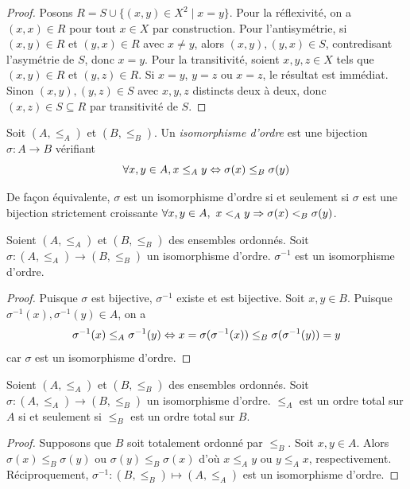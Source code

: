 \begin{proof}
Posons $R = S \cup \{(x,y) \in X^2 \mid x = y\}$. 
Pour la réflexivité, on a $(x,x) \in R$ pour tout $x \in X$ par construction. 
Pour l'antisymétrie, si $(x,y) \in R$ et $(y,x) \in R$ avec $x \neq y$, alors $(x,y), (y,x) \in S$, contredisant l'asymétrie de $S$, donc $x = y$. 
Pour la transitivité, soient $x, y, z \in X$ tels que $(x,y) \in R$ et $(y,z) \in R$. Si $x = y$, $y = z$ ou $x = z$, le résultat est immédiat. Sinon $(x,y), (y,z) \in S$ avec $x, y, z$ distincts deux à deux, donc $(x,z) \in S \subseteq R$ par transitivité de $S$.
\end{proof}
\begin{definition}
    Soit $(A,\le_A)$ et $(B,\le_B)$. Un \emph{isomorphisme d'ordre} est une bijection $\sigma : A\to B$ vérifiant $$\forall x,y\in A, x\le_A y\Leftrightarrow \sigma(x)\le_B \sigma(y)$$ 
\end{definition}
\begin{remarque}
    De façon équivalente, $\sigma$ est un isomorphisme d'ordre si et seulement si $\sigma$ est une bijection strictement croissante \ie $\forall x,y\in A,\ x<_Ay\Rightarrow \sigma(x)<_B\sigma(y)$.
\end{remarque}

\begin{proposition}\label{ens : ordre : inverse_iso}
    Soient $(A,\le_A)$ et $(B,\le_B)$ des ensembles ordonnés. Soit $\sigma : (A,\le_A)\to (B,\le_B)$ un isomorphisme d'ordre. $\sigma^{-1}$ est un isomorphisme d'ordre.
\end{proposition}
\begin{proof}
    Puisque $\sigma$ est bijective, $\sigma^{-1}$ existe et est bijective.
    Soit $x,y\in B$. Puisque $\sigma^{-1}(x),\sigma^{-1}(y)\in A$, on a $$\sigma^{-1}(x)\le_A\sigma^{-1}(y)\Leftrightarrow x = \sigma(\sigma^{-1}(x))\le_B \sigma(\sigma^{-1}(y)) = y$$ car $\sigma$ est un isomorphisme d'ordre.
\end{proof}

\begin{proposition}\label{ens : ordre : iso_entre_totaux}
    Soient $(A,\le_A)$ et $(B,\le_B)$ des ensembles ordonnés. Soit $\sigma : (A,\le_A)\to (B,\le_B)$ un isomorphisme d'ordre. $\leq_A$ est un ordre total sur $A$ si et seulement si $\leq _B$ est un ordre total sur $B$. 
\end{proposition}
\begin{proof}
    Supposons que $B$ soit totalement ordonné par $\le_B$. Soit $x,y\in A$. Alors $\sigma(x)\le_B\sigma(y)$ ou $\sigma(y)\le_B\sigma(x)$ d'où $x\le_Ay$ ou $y\le_A x$, respectivement.
    Réciproquement, $\sigma^{-1}:(B,\le_B)\mapsto(A,\le_A)$ est un isomorphisme d'ordre.
\end{proof}

